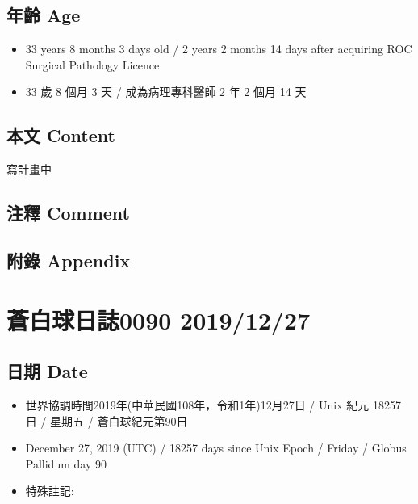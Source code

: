\documentclass[
]{article}
\providecommand{\tightlist}{%
  \setlength{\itemsep}{0pt}\setlength{\parskip}{0pt}}
\begin{document}
\hypertarget{ux5e74ux9f61-age-25}{%
\subsection{年齡 Age}\label{ux5e74ux9f61-age-25}}

\begin{itemize}
\tightlist
\item
  33 years 8 months 3 days old / 2 years 2 months 14 days after
  acquiring ROC Surgical Pathology Licence
\item
  33 歲 8 個月 3 天 / 成為病理專科醫師 2 年 2 個月 14 天
\end{itemize}

\hypertarget{ux672cux6587-content-25}{%
\subsection{本文 Content}\label{ux672cux6587-content-25}}

寫計畫中

\hypertarget{ux6ce8ux91cb-comment-24}{%
\subsection{注釋 Comment}\label{ux6ce8ux91cb-comment-24}}

\hypertarget{ux9644ux9304-appendix-25}{%
\subsection{附錄 Appendix}\label{ux9644ux9304-appendix-25}}

\hypertarget{ux84bcux767dux7403ux65e5ux8a8c0090-20191227}{%
\section{蒼白球日誌0090
2019/12/27}\label{ux84bcux767dux7403ux65e5ux8a8c0090-20191227}}

\hypertarget{ux65e5ux671f-date-26}{%
\subsection{日期 Date}\label{ux65e5ux671f-date-26}}

\begin{itemize}
\tightlist
\item
  世界協調時間2019年(中華民國108年，令和1年)12月27日 / Unix 紀元 18257
  日 / 星期五 / 蒼白球紀元第90日
\item
  December 27, 2019 (UTC) / 18257 days since Unix Epoch / Friday /
  Globus Pallidum day 90
\item
  特殊註記:
\end{itemize}
\end{document}

